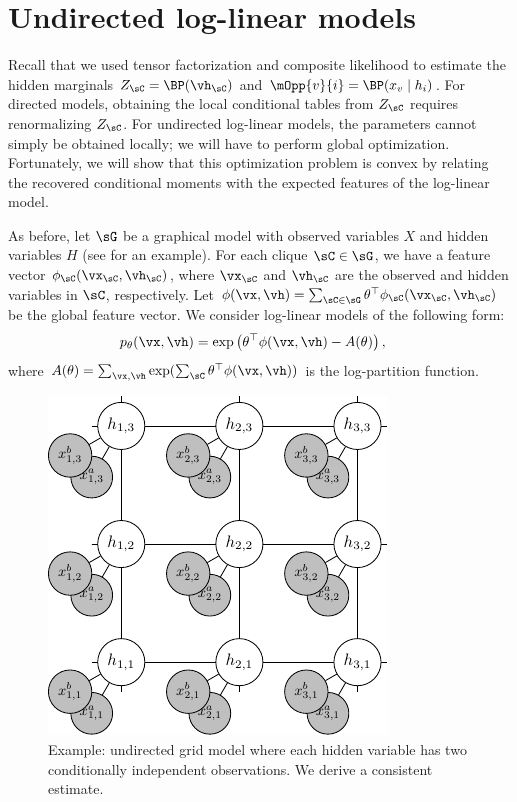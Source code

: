 \section{Undirected log-linear models}
\label{sec:undirected}

Recall that we used tensor factorization and composite likelihood
to estimate the hidden marginals $Z_\sC = \BP(\vh_\sC)$ and $\mOpp{v}{i} = \BP(x_v \mid h_i)$.
For directed models, obtaining the local conditional tables from $Z_\sC$ requires
renormalizing $Z_\sC$.
For undirected log-linear models, the parameters cannot simply be obtained locally;
we will have to perform global optimization.
Fortunately, we will show that this optimization problem is convex
by relating the recovered conditional moments with the expected features of
the log-linear model.

As before, let $\sG$ be a graphical model with observed variables $X$ and hidden variables $H$
(see  for an example).
For each clique $\sC \in \sG$, we have a feature vector $\phi_\sC(\vx_\sC, \vh_\sC)$,
where $\vx_\sC$ and $\vh_\sC$ are the observed and hidden variables in $\sC$, respectively.
Let $\phi(\vx, \vh) = \sum_{\sC \in \sG} \theta^\top \phi_\sC(\vx_\sC,\vh_\sC)$ be the global feature vector.
We consider log-linear models of the following form:
\begin{align}
p_\theta(\vx, \vh) &= \exp\left( \theta^\top \phi(\vx,\vh) - A(\theta) \right),
\end{align}
where $A(\theta) = \sum_{\vx, \vh}  \exp( \sum_\sC \theta^\top \phi(\vx,\vh) )$ is the log-partition function.

\begin{figure}
  \centering
  \includegraphics[width=0.6\columnwidth]{figures/mrf.pdf}
  \caption{Example: undirected grid model where each hidden variable has two
  conditionally independent observations.
  We derive a consistent estimate.}
  \label{fig:examples-mrf}
\end{figure}

